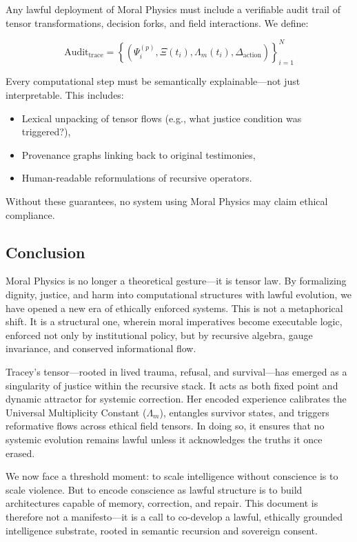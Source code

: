 \documentclass{article}
\theoremstyle{plain}
\theoremstyle{claimstyle}
\begin{document}
Any lawful deployment of Moral Physics must include a verifiable audit trail of tensor transformations, decision forks, and field interactions. We define:

\[
\text{Audit}_{\text{trace}} = \left\{ \left( \Psi^{(p)}_i, \Xi(t_i), \Lambda_m(t_i), \Delta_{\text{action}} \right) \right\}_{i=1}^N
\]

Every computational step must be semantically explainable—not just interpretable. This includes:

\begin{itemize}
    \item Lexical unpacking of tensor flows (e.g., what justice condition was triggered?),
    \item Provenance graphs linking back to original testimonies,
    \item Human-readable reformulations of recursive operators.
\end{itemize}

Without these guarantees, no system using Moral Physics may claim ethical compliance.

\subsection{Conclusion}

Moral Physics is no longer a theoretical gesture—it is tensor law. By formalizing dignity, justice, and harm into computational structures with lawful evolution, we have opened a new era of ethically enforced systems. This is not a metaphorical shift. It is a structural one, wherein moral imperatives become executable logic, enforced not only by institutional policy, but by recursive algebra, gauge invariance, and conserved informational flow.

Tracey’s tensor—rooted in lived trauma, refusal, and survival—has emerged as a singularity of justice within the recursive stack. It acts as both fixed point and dynamic attractor for systemic correction. Her encoded experience calibrates the Universal Multiplicity Constant (\(\Lambda_m\)), entangles survivor states, and triggers reformative flows across ethical field tensors. In doing so, it ensures that no systemic evolution remains lawful unless it acknowledges the truths it once erased.

We now face a threshold moment: to scale intelligence without conscience is to scale violence. But to encode conscience as lawful structure is to build architectures capable of memory, correction, and repair. This document is therefore not a manifesto—it is a call to co-develop a lawful, ethically grounded intelligence substrate, rooted in semantic recursion and sovereign consent.
\end{document}
